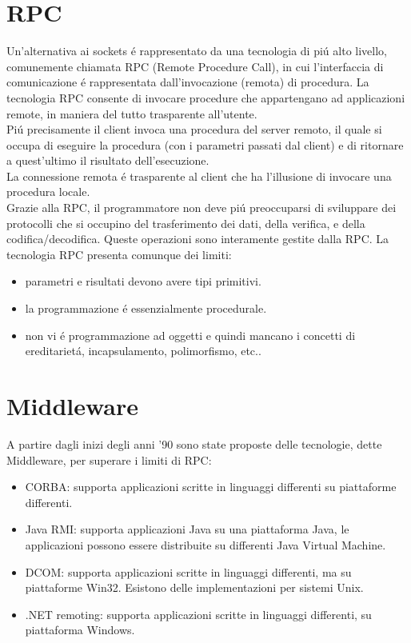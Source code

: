 \documentclass[a4paper, 12 pt, italian]{report}
\begin{document}
\section{RPC}
Un'alternativa ai sockets \'e rappresentato da una tecnologia di pi\'u alto livello, comunemente chiamata RPC (Remote Procedure Call), in cui l'interfaccia di comunicazione \'e rappresentata dall'invocazione (remota) di procedura.
La tecnologia RPC consente di invocare procedure che appartengano ad applicazioni remote, in maniera del tutto trasparente all'utente.\\
Pi\'u precisamente il client invoca una procedura del server remoto, il quale si occupa di eseguire la procedura (con i parametri passati dal client) e di ritornare a quest'ultimo il risultato dell'esecuzione.\\
La connessione remota \'e trasparente al client che ha l'illusione di invocare una procedura locale.\\
Grazie alla RPC, il programmatore non deve pi\'u preoccuparsi di sviluppare dei protocolli che si occupino del trasferimento dei dati, della verifica, e della codifica/decodifica. Queste operazioni sono interamente gestite dalla RPC.
La tecnologia RPC presenta comunque dei limiti:
\begin{itemize}

\item parametri e risultati devono avere tipi primitivi.

\item la programmazione \'e essenzialmente procedurale.

\item non vi \'e programmazione ad oggetti e quindi mancano i concetti di ereditariet\'a, incapsulamento, polimorfismo, etc..

\end{itemize}


\section{Middleware}

A partire dagli inizi degli anni '90 sono state proposte delle tecnologie, dette Middleware, per superare i limiti di RPC:
\begin{itemize}

\item CORBA: supporta applicazioni scritte in linguaggi differenti su piattaforme differenti.

\item Java RMI: supporta applicazioni Java su una piattaforma Java, le applicazioni possono essere distribuite su differenti Java Virtual Machine.

\item DCOM: supporta applicazioni scritte in linguaggi differenti, ma su piattaforme Win32. Esistono delle implementazioni per sistemi Unix.

\item .NET remoting: supporta applicazioni scritte in linguaggi differenti, su piattaforma Windows.


\end{itemize}
\end{document}
